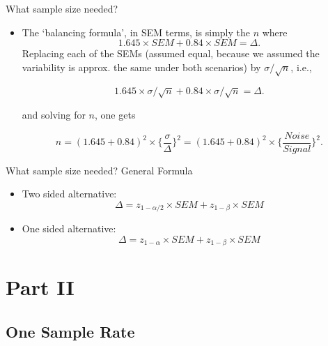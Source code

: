 \documentclass[10pt]{beamer}\usepackage[]{graphicx}\usepackage[]{color}
\begin{document}
\begin{frame}{What sample size needed?}
	
	\begin{itemize}
		\setlength\itemsep{1em}
		\item The `balancing formula', in SEM terms, is simply the $n$ where
		$$ 1.645 \times SEM + 0.84 \times SEM = \Delta.$$
		Replacing each of the  SEMs (assumed equal, because we assumed the variability
		is approx. the same under both scenarios) by $\sigma/\sqrt{n}$,  i.e.,
		
		$$ 1.645 \times \sigma/\sqrt{n} + 0.84 \times \sigma/\sqrt{n} = \Delta.$$
		
		and solving for $n$, one gets
		
		$$  n = (1.645 + 0.84)^2  \times \bigg\{ \frac{\sigma}{\Delta} \bigg\}^2 = 
		(1.645 + 0.84)^2  \times \bigg\{ \frac{Noise}{Signal} \bigg\}^2 .$$
	\end{itemize}
	
\end{frame}

\begin{frame}{What sample size needed? General Formula}
	
	\begin{itemize}
		\setlength\itemsep{2em}
		\item Two sided alternative:
		$$\Delta = z_{1-\alpha/2} \times SEM + z_{1-\beta} \times SEM$$
		
		\item One sided alternative:
		$$\Delta = z_{1-\alpha} \times SEM + z_{1-\beta} \times SEM$$
	\end{itemize}
	
\end{frame}

\section{Part II}


\subsection{One Sample Rate}
\end{document}
